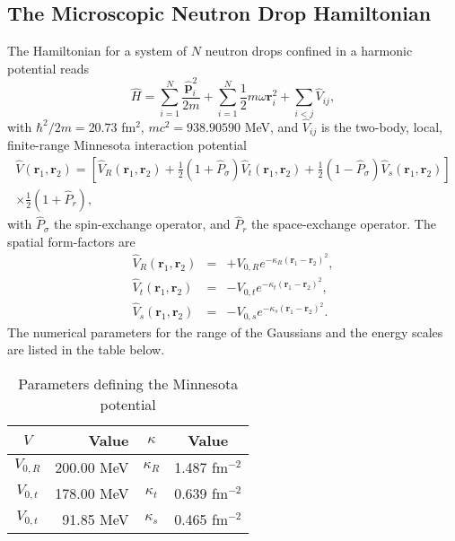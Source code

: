 \documentclass[letterpaper,12pt]{article}
\newcommand{\gras}[1]{\boldsymbol{#1}}
\begin{document}
\begin{appendix}

\section{The Microscopic Neutron Drop Hamiltonian}

The Hamiltonian for a system of $N$ neutron drops confined in a harmonic potential reads
\begin{equation}
\hat{H} 
= 
\sum_{i=1}^{N} \frac{\hat{\gras{p}}_{i}^{2}}{2m}
+
\sum_{i=1}^{N} \frac{1}{2} m\omega \gras{r}_{i}^{2}
+
\sum_{i<j} \hat{V}_{ij},
\end{equation}
with $\hbar^{2}/2m = 20.73$ fm$^{2}$, $mc^{2} = 938.90590$ MeV, and $\hat{V}_{ij}$ is the two-body, local, finite-range Minnesota interaction potential
\begin{multline}
\hat{V}(\gras{r}_{1},\gras{r}_{2}) = 
\left[ 
\hat{V}_{R}(\gras{r}_{1},\gras{r}_{2}) 
+ 
\frac{1}{2}\left( 1 + \hat{P}_{\sigma}\right) \hat{V}_{t}(\gras{r}_{1},\gras{r}_{2})
+ 
\frac{1}{2}\left( 1 - \hat{P}_{\sigma}\right) \hat{V}_{s}(\gras{r}_{1},\gras{r}_{2})
\right] \\
\times\frac{1}{2}\left( 1 + \hat{P}_{r}\right),
\end{multline}
with $\hat{P}_{\sigma}$ the spin-exchange operator, and $\hat{P}_{r}$ the space-exchange operator. The spatial form-factors are
\begin{eqnarray}
\hat{V}_{R}(\gras{r}_{1},\gras{r}_{2})  & = & + V_{0,R} e^{-\kappa_{R}(\gras{r}_{1} - \gras{r}_{2})^{2}}, \\
\hat{V}_{t}(\gras{r}_{1},\gras{r}_{2})  & = & - V_{0,t} e^{-\kappa_{t}(\gras{r}_{1} - \gras{r}_{2})^{2}}, \\
\hat{V}_{s}(\gras{r}_{1},\gras{r}_{2})  & = & - V_{0,s} e^{-\kappa_{s}(\gras{r}_{1} - \gras{r}_{2})^{2}}.
\end{eqnarray}
The numerical parameters for the range of the Gaussians and the energy scales are listed in the table below.
\begin{table}[h]
\caption{Parameters defining the Minnesota potential}
\begin{center}
\begin{tabular}{crcc}
$V$ & Value & $\kappa$ & Value \\
\hline
$V_{0,R}$ & 200.00 MeV & $\kappa_{R}$ & 1.487 fm$^{-2}$ \\
$V_{0,t}$ & 178.00 MeV & $\kappa_{t}$ & 0.639 fm$^{-2}$ \\
$V_{0,t}$ &  91.85 MeV & $\kappa_{s}$ & 0.465 fm$^{-2}$ \\
\end{tabular}
\end{center}
\end{table}

\end{appendix}
\end{document}

